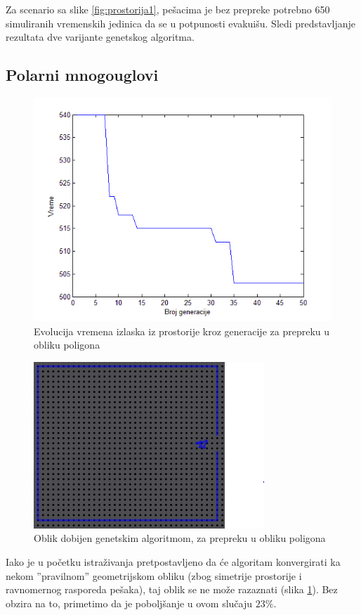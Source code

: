 \documentclass[12pt]{article}
\begin{document}
Za scenario sa slike \ref{fig:prostorija1}, pešacima je bez prepreke potrebno 650 simuliranih vremenskih jedinica da se u potpunosti evakuišu. Sledi predstavljanje rezultata dve varijante genetskog algoritma.

\subsection*{Polarni mnogouglovi}

\begin{figure}
\centering
\includegraphics[scale=.6]{polygon-plot}
\caption{Evolucija vremena izlaska iz prostorije kroz generacije za prepreku u obliku poligona}
\end{figure}

\begin{figure}[h]
\centering
\includegraphics{polygon2}
\caption{Oblik dobijen genetskim algoritmom, za prepreku u obliku poligona}
\label{fig:polygon2}
\end{figure}
Iako je u početku istraživanja pretpostavljeno da će algoritam konvergirati ka nekom ''pravilnom'' geometrijskom obliku (zbog simetrije prostorije i ravnomernog rasporeda pešaka), taj oblik se ne može razaznati (slika \ref{fig:polygon2}). Bez obzira na to, primetimo da je poboljšanje u ovom slučaju $23\%$.
\end{document}
